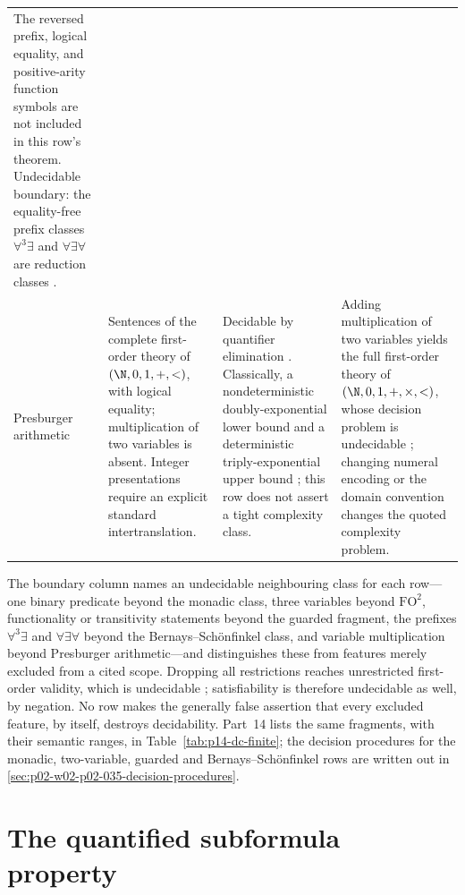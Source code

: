 \begin{landscape}
\begin{longtable}{@{}p{.90in}p{2.20in}p{2.10in}p{2.00in}@{}}
The reversed prefix, logical equality, and positive-arity function symbols are
not included in this row's theorem.
Undecidable boundary: the equality-free prefix classes
\(\forall^{3}\exists\) and \(\forall\exists\forall\) are reduction classes
\cite[p.~311]{BorgerGradelGurevich1997}. \\
\addlinespace
Presburger arithmetic
\index{Presburger arithmetic} &
Sentences of the complete first-order theory of
\((\N,0,1,+,<)\), with logical equality; multiplication of two variables is
absent.  Integer presentations require an explicit standard intertranslation. &
Decidable by quantifier elimination \cite{Presburger1929}.  Classically, a
nondeterministic doubly-exponential lower bound
\cite{FischerRabin1974} and a deterministic triply-exponential upper bound
\cite{Oppen1978}; this row does not assert a tight complexity class. &
Adding multiplication of two variables yields the full first-order theory of
\((\N,0,1,+,\times,<)\), whose decision problem is undecidable
\cite{DavisPutnamRobinson1961,Matiyasevich1970}; changing numeral encoding or the domain
convention changes the quoted complexity problem. \\
\bottomrule
\end{longtable}
\endgroup
\end{landscape}

The boundary column names an undecidable neighbouring class for each row---one
binary predicate beyond the monadic class, three variables beyond
\(\mathrm{FO}^{2}\), functionality or transitivity statements beyond the
guarded fragment, the prefixes \(\forall^{3}\exists\) and \(\forall\exists\forall\)
beyond the Bernays--Sch\"onfinkel class, and variable multiplication beyond
Presburger arithmetic---and distinguishes these from features merely excluded
from a cited scope.
Dropping all restrictions reaches unrestricted first-order validity, which is
undecidable \cite{Church1936,Turing1937}; satisfiability is therefore
undecidable as well, by negation.  No row makes the generally false assertion
that every excluded feature, by itself, destroys decidability.
Part~14 lists the same fragments, with their semantic ranges, in
Table~\ref{tab:p14-dc-finite}; the decision procedures for the monadic,
two-variable, guarded and Bernays--Sch\"onfinkel rows are written out in
\cref{sec:p02-w02-p02-035-decision-procedures}.

\section{The quantified subformula property}
\label{sec:p02-fol-subformula-property}


